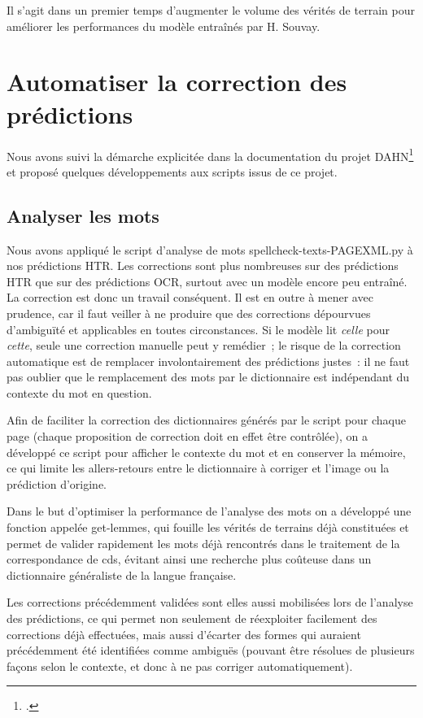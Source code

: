 \documentclass[a4paper,12pt,twoside]{book}
\begin{document}
			Il s'agit dans un premier temps d'augmenter le volume des vérités de terrain pour améliorer les performances du modèle entraînés par H. Souvay.
	
		\section{Automatiser la correction des prédictions}
			Nous avons suivi la démarche explicitée dans la documentation du projet DAHN\footcite{chiffoleauHowPostOCRCorrection2022} et proposé quelques développements aux scripts issus de ce projet.
					
			\subsection{Analyser les mots}
				Nous avons appliqué le script d'analyse de mots \textsf{spellcheck-texts-PAGEXML.py} à nos prédictions HTR. Les corrections sont plus nombreuses sur des prédictions HTR que sur des prédictions OCR, surtout avec un modèle encore peu entraîné. La correction est donc un travail conséquent. Il est en outre à mener avec prudence, car il faut veiller à ne produire que des corrections dépourvues d'ambiguïté et applicables en toutes circonstances. Si le modèle lit \textit{celle} pour \textit{cette}, seule une correction manuelle peut y remédier~; le risque de la correction automatique est de remplacer involontairement des prédictions justes~: il ne faut pas oublier que le remplacement des mots par le dictionnaire est indépendant du contexte du mot en question.
				
				Afin de faciliter la correction des dictionnaires générés par le script pour chaque page (chaque proposition de correction doit en effet être contrôlée), on a développé ce script pour afficher le contexte du mot et en conserver la mémoire, ce qui limite les allers-retours entre le dictionnaire à corriger et l'image ou la prédiction d'origine.
				
				Dans le but d'optimiser la performance de l'analyse des mots on a développé une fonction appelée \textsf{get-lemmes}, qui fouille les vérités de terrains déjà constituées et permet de valider rapidement les mots déjà rencontrés dans le traitement de la correspondance de \gls{cds}, évitant ainsi une recherche plus coûteuse dans un dictionnaire généraliste de la langue française.
				
				Les corrections précédemment validées sont elles aussi mobilisées lors de l'analyse des prédictions, ce qui permet non seulement de réexploiter facilement des corrections déjà effectuées, mais aussi d'écarter des formes qui auraient précédemment été identifiées comme ambiguës (pouvant être résolues de plusieurs façons selon le contexte, et donc à ne pas corriger automatiquement).
				
\end{document}
